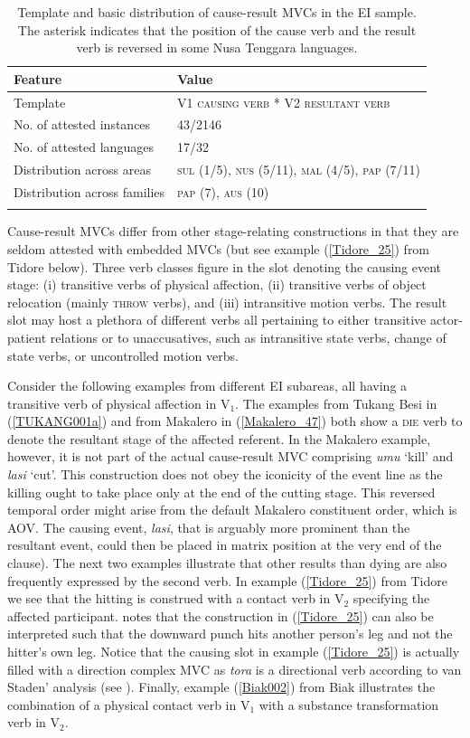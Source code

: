 \begin{table}
\begin{tabular}{ll}
\lsptoprule
Feature&Value\tabularnewline
\midrule
Template&V1 \textsc{causing verb} * V2 \textsc{resultant verb}\tabularnewline
No. of attested instances& 43/2146 \tabularnewline
No. of attested languages& 17/32 \tabularnewline
Distribution across areas& \textsc{sul} (1/5), \textsc{nus} (5/11), \textsc{mal} (4/5), \textsc{pap} (7/11) \tabularnewline
Distribution across families& \textsc{pap} (7), \textsc{aus} (10) \tabularnewline
\lspbottomrule
\end{tabular}
\caption[Template and basic distribution of cause-result MVCs]{Template and basic distribution of cause-result MVCs in the EI sample. The asterisk indicates that the position of the cause verb and the result verb is reversed in some Nusa Tenggara languages.}
\label{table:cause-result}
\end{table}

Cause-result MVCs differ from other stage-relating constructions in that they are seldom attested with embedded MVCs (but see example (\ref{Tidore_25}) from Tidore below). Three verb classes figure in the slot denoting the causing event stage: (i) transitive verbs of physical affection, (ii) transitive verbs of object relocation (mainly \textsc{throw} verbs), and (iii) intransitive motion verbs. The result slot may host a plethora of different verbs all pertaining to either transitive actor-patient relations or to unaccusatives, such as intransitive state verbs, change of state verbs, or uncontrolled motion verbs. 

Consider the following examples from different EI subareas, all having a transitive verb of physical affection in V$_1$. The examples from Tukang Besi in (\ref{TUKANG001a}) and from Makalero in (\ref{Makalero_47}) both show a \textsc{die} verb to denote the resultant stage of the affected referent. In the Makalero example, however, it is not part of the actual cause-result MVC comprising \textit{umu} `kill' and \textit{lasi} `cut'. This construction does not obey the iconicity of the event line as the killing ought to take place only at the end of the cutting stage. This reversed temporal order might arise from the default Makalero constituent order, which is AOV. The causing event, \textit{lasi}, that is arguably more prominent than the resultant event, could then be placed in matrix position at the very end of the clause). The next two examples illustrate that other results than dying are also frequently expressed by the second verb. In example (\ref{Tidore_25}) from Tidore we see that the hitting is construed with a contact verb in V$_2$ specifying the affected participant. \citet[126]{vanstaden2000tidore} notes that the construction in (\ref{Tidore_25}) can also be interpreted such that the downward punch hits another person's leg and not the hitter's own leg. Notice that the causing slot in example (\ref{Tidore_25}) is actually filled with a direction complex MVC as \textit{tora} is a directional verb according to van Staden' analysis (see \citealt[110]{vanstaden2000tidore}).  Finally, example (\ref{Biak002}) from Biak illustrates the combination of a physical contact verb in V$_1$ with a substance transformation verb in V$_2$.

